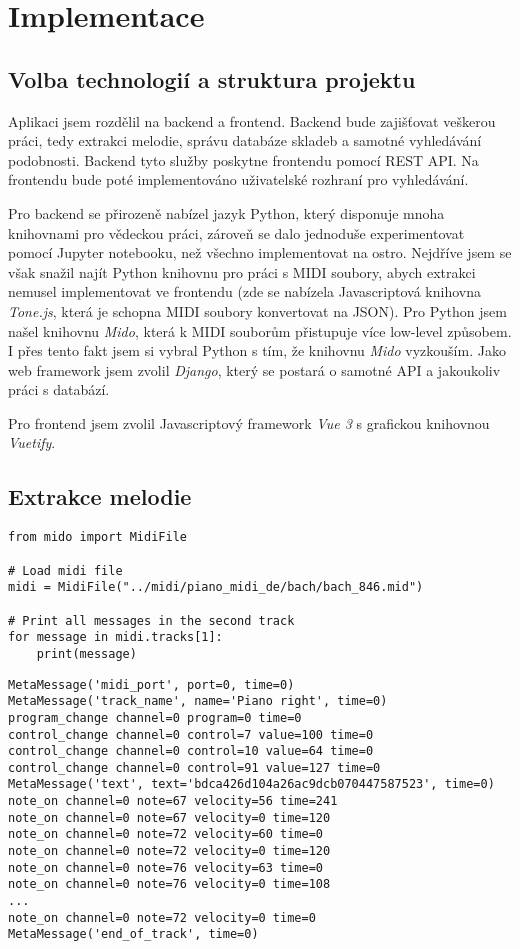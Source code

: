 \section{Implementace}

\subsection{Volba technologií a struktura projektu}
Aplikaci jsem rozdělil na backend a frontend. Backend bude zajišťovat veškerou  práci, tedy extrakci melodie, správu databáze skladeb a samotné vyhledávání podobnosti. Backend tyto služby poskytne frontendu pomocí REST API. Na frontendu bude poté implementováno uživatelské rozhraní pro vyhledávání.

Pro backend se přirozeně nabízel jazyk Python, který disponuje mnoha knihovnami pro vědeckou práci, zároveň se dalo jednoduše experimentovat pomocí Jupyter notebooku, než všechno implementovat na ostro. Nejdříve jsem se však snažil najít Python knihovnu pro práci s MIDI soubory, abych extrakci nemusel implementovat ve frontendu (zde se nabízela Javascriptová knihovna \textit{Tone.js}, která je schopna MIDI soubory konvertovat na JSON). Pro Python jsem našel knihovnu \textit{Mido}, která k MIDI souborům přistupuje více low-level způsobem. I přes tento fakt jsem si vybral Python s tím, že knihovnu \textit{Mido} vyzkouším. Jako web framework jsem zvolil \textit{Django}, který se postará o samotné API a jakoukoliv práci s databází.

Pro frontend jsem zvolil Javascriptový framework \textit{Vue 3} s grafickou knihovnou \textit{Vuetify}.

\subsection{Extrakce melodie}
\cite{mido}\cite{midi-standard}

\begin{verbatim}
from mido import MidiFile

# Load midi file
midi = MidiFile("../midi/piano_midi_de/bach/bach_846.mid")

# Print all messages in the second track
for message in midi.tracks[1]:
    print(message)
\end{verbatim}
\begin{verbatim}
MetaMessage('midi_port', port=0, time=0)
MetaMessage('track_name', name='Piano right', time=0)
program_change channel=0 program=0 time=0
control_change channel=0 control=7 value=100 time=0
control_change channel=0 control=10 value=64 time=0
control_change channel=0 control=91 value=127 time=0
MetaMessage('text', text='bdca426d104a26ac9dcb070447587523', time=0)
note_on channel=0 note=67 velocity=56 time=241
note_on channel=0 note=67 velocity=0 time=120
note_on channel=0 note=72 velocity=60 time=0
note_on channel=0 note=72 velocity=0 time=120
note_on channel=0 note=76 velocity=63 time=0
note_on channel=0 note=76 velocity=0 time=108
...
note_on channel=0 note=72 velocity=0 time=0
MetaMessage('end_of_track', time=0)
\end{verbatim}